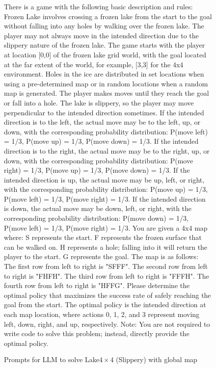 \documentclass{article}
\begin{document}
\begin{figure}
\begin{mdframed}[roundcorner=10pt]
There is a game with the following basic description and rules:
Frozen Lake involves crossing a frozen lake from the start to the goal without falling into any holes by walking over the frozen lake. The player may not always move in the intended direction due to the slippery nature of the frozen lake.
The game starts with the player at location [0,0] of the frozen lake grid world, with the goal located at the far extent of the world, for example, [3,3] for the 4x4 environment.
Holes in the ice are distributed in set locations when using a pre-determined map or in random locations when a random map is generated.
The player makes moves until they reach the goal or fall into a hole.
The lake is slippery, so the player may move perpendicular to the intended direction sometimes.
If the intended direction is to the left, the actual move may be to the left, up, or down, with the corresponding probability distribution: P(move left) = 1/3, P(move up) = 1/3, P(move down) = 1/3.
If the intended direction is to the right, the actual move may be to the right, up, or down, with the corresponding probability distribution: P(move right) = 1/3, P(move up) = 1/3, P(move down) = 1/3.
If the intended direction is up, the actual move may be up, left, or right, with the corresponding probability distribution: P(move up) = 1/3, P(move left) = 1/3, P(move right) = 1/3.
If the intended direction is down, the actual move may be down, left, or right, with the corresponding probability distribution: P(move down) = 1/3, P(move left) = 1/3, P(move right) = 1/3.
You are given a 4x4 map where:
S represents the start.
F represents the frozen surface that can be walked on.
H represents a hole; falling into it will return the player to the start.
G represents the goal.
The map is as follows:
The first row from left to right is "SFFF".
The second row from left to right is "FHFH".
The third row from left to right is "FFFH".
The fourth row from left to right is "HFFG".
Please determine the optimal policy that maximizes the success rate of safely reaching the goal from the start. The optimal policy is the intended direction at each map location, where actions 0, 1, 2, and 3 represent moving left, down, right, and up, respectively.
Note: You are not required to write code to solve this problem; instead, directly provide the optimal policy.
\end{mdframed}
\caption{Prompts for LLM to solve Lake$4\times4$ (Slippery) with global map}
\label{page:prompts_with_map}
\end{figure}
\end{document}
